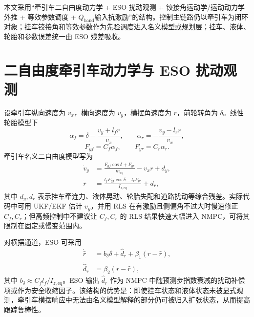 \documentclass[UTF8,zihao=-4]{ctexrep}
\newcommand{\Qband}{$Q_{\mathrm{band}}$}
\begin{document}
本文采用“牵引车二自由度动力学 + ESO 扰动观测 + 铰接角运动学/运动动力学外推 + 等效参数调度 + \Qband 输入抗激励”的结构。控制主链路仍以牵引车为闭环对象；挂车铰接角和等效参数作为先验调度进入名义模型或规划层；挂车、液体、轮胎和参数误差统一由 ESO 残差吸收。

\section{二自由度牵引车动力学与 ESO 扰动观测}
设牵引车纵向速度为 $v_x$，横向速度为 $v_y$，横摆角速度为 $r$，前轮转角为 $\delta$。线性轮胎模型下
\begin{equation}
    \alpha_f=\delta-\frac{v_y+l_fr}{v_x},\qquad
    \alpha_r=-\frac{v_y-l_rr}{v_x},
\end{equation}
\begin{equation}
    F_{yf}=C_f\alpha_f,
    \qquad F_{yr}=C_r\alpha_r.
\end{equation}
牵引车名义二自由度模型写为
\begin{equation}
\begin{aligned}
    \dot v_y &= \frac{F_{yf}\cos\delta+F_{yr}}{m_{\mathrm{eq}}}-v_xr+d_y,\\
    \dot r &= \frac{l_fF_{yf}\cos\delta-l_rF_{yr}}{I_{z,\mathrm{eq}}}+d_r,
\end{aligned}
\label{eq:2dof_eso}
\end{equation}
其中 $d_y,d_r$ 表示挂车牵连力、液体晃动、轮胎失配和道路扰动等综合残差。实际代码中可用 UKF/EKF 估计 $v_y$，并用 RLS 在有激励且侧偏角不过大时慢速修正 $C_f,C_r$；但高频控制中不建议让 $C_f,C_r$ 的 RLS 结果快速大幅进入 NMPC，可将其限制在固定或慢变范围内。

对横摆通道，ESO 可采用
\begin{equation}
\begin{aligned}
    \dot{\hat r} &= b_\delta\delta + \hat d_r + \beta_1(r-\hat r),\\
    \dot{\hat d}_r &= \beta_2(r-\hat r),
\end{aligned}
\label{eq:eso_yaw}
\end{equation}
其中 $b_\delta\approx C_fl_f/I_{z,\mathrm{eq}}$。ESO 输出 $\hat d_r$ 作为 NMPC 中随预测步指数衰减的扰动补偿项或作为安全收缩因子。该结构的优势是：即使挂车状态和液体状态未被显式观测，牵引车横摆响应中无法由名义模型解释的部分仍可被归入扩张状态，从而提高跟踪鲁棒性。
\end{document}
